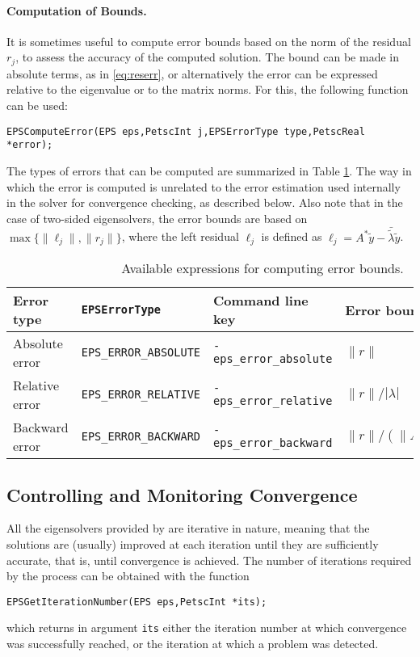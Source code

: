 \paragraph{Computation of Bounds.}
It is sometimes useful to compute error bounds based on the norm of the residual $r_j$, to assess the accuracy of the computed solution. The bound can be made in absolute terms, as in \eqref{eq:reserr}, or alternatively the error can be expressed relative to the eigenvalue or to the matrix norms. For this, the following function can be used:
        \begin{Verbatim}[fontsize=\small]
        EPSComputeError(EPS eps,PetscInt j,EPSErrorType type,PetscReal *error);
        \end{Verbatim}
The types of errors that can be computed are summarized in Table \ref{tab:errors}.
The way in which the error is computed is unrelated to the error estimation used internally in the solver for convergence checking, as described below. Also note that in the case of two-sided eigensolvers, the error bounds are based on $\max\{\|\ell_j\|,\|r_j\|\}$, where the left residual $\ell_j$ is defined as $\ell_j=A^*\tilde{y}-\bar{\tilde\lambda}\tilde{y}$.

\begin{table}
\centering
{\small \begin{tabular}{llll}
Error type     & \texttt{EPSErrorType}         & Command line key               & Error bound \\\hline
Absolute error & \texttt{EPS\_ERROR\_ABSOLUTE} & \texttt{-eps\_error\_absolute} & $\|r\|$ \\
Relative error & \texttt{EPS\_ERROR\_RELATIVE} & \texttt{-eps\_error\_relative} & $\|r\|/|\lambda|$ \\
Backward error & \texttt{EPS\_ERROR\_BACKWARD} & \texttt{-eps\_error\_backward} & $\|r\|/(\|A\|+|\lambda|\|B\|)$ \\
\hline
\end{tabular} }
\caption{\label{tab:errors}Available expressions for computing error bounds.}
\end{table}

\subsection{Controlling and Monitoring Convergence}
\label{sec:monitor}

All the eigensolvers provided by \slepc are iterative in nature, meaning that the solutions are (usually) improved at each iteration until they are sufficiently accurate, that is, until convergence is achieved. The number of iterations required by the process can be obtained with the function%
        \begin{Verbatim}[fontsize=\small]
        EPSGetIterationNumber(EPS eps,PetscInt *its);
        \end{Verbatim}
which returns in argument \texttt{its} either the iteration number at which convergence was successfully reached, or the iteration at which a problem was detected.


